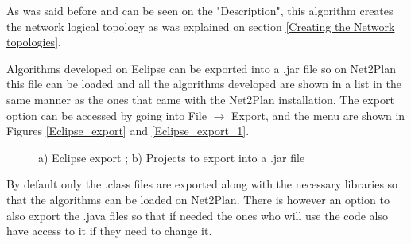 				
			
	As was said before and can be seen on the "Description", this algorithm creates the network logical topology as was explained on section \ref{Creating the Network topologies}.
			
	Algorithms developed on Eclipse can be exported into a .jar file so on Net2Plan this file can be loaded and all the algorithms developed are shown in a list in the same manner as the ones that came with the Net2Plan installation. The export option can be accessed by going into File $\rightarrow$ Export, and the menu are shown in Figures \ref{Eclipse_export} and \ref{Eclipse_export_1}.
	
	\begin{figure}[!h]
		\centering
		\caption{a) Eclipse export ; b) Projects to export into a .jar file}
	\end{figure}
	
	By default only the .class files are exported along with the necessary libraries so that the algorithms can be loaded on Net2Plan. There is however an option to also export the .java files so that if needed the ones who will use the code also have access to it if they need to change it.
	 						
